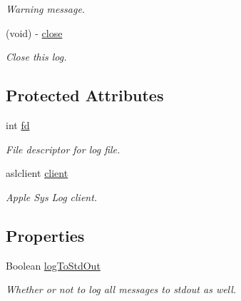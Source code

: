 \begin{DoxyCompactItemize}
\begin{DoxyCompactList}\small\item\em Warning message. \item\end{DoxyCompactList}\item 
(void) -\/ \hyperlink{interface_g_d_a_s_l_log_ae49db911364a0162197ad1044126c664}{close}
\begin{DoxyCompactList}\small\item\em Close this log. \item\end{DoxyCompactList}\end{DoxyCompactItemize}
\subsection*{Protected Attributes}
\begin{DoxyCompactItemize}
\item 
\hypertarget{interface_g_d_a_s_l_log_aa69c49b2936c65539d487acfbac9185d}{
int \hyperlink{interface_g_d_a_s_l_log_aa69c49b2936c65539d487acfbac9185d}{fd}}
\label{interface_g_d_a_s_l_log_aa69c49b2936c65539d487acfbac9185d}

\begin{DoxyCompactList}\small\item\em File descriptor for log file. \item\end{DoxyCompactList}\item 
\hypertarget{interface_g_d_a_s_l_log_ab29df9174c1a01a320b089b589fa731e}{
aslclient \hyperlink{interface_g_d_a_s_l_log_ab29df9174c1a01a320b089b589fa731e}{client}}
\label{interface_g_d_a_s_l_log_ab29df9174c1a01a320b089b589fa731e}

\begin{DoxyCompactList}\small\item\em Apple Sys Log client. \item\end{DoxyCompactList}\end{DoxyCompactItemize}
\subsection*{Properties}
\begin{DoxyCompactItemize}
\item 
\hypertarget{interface_g_d_a_s_l_log_af52ec0d7d7a656c095fc8af8d7035065}{
Boolean \hyperlink{interface_g_d_a_s_l_log_af52ec0d7d7a656c095fc8af8d7035065}{logToStdOut}}
\label{interface_g_d_a_s_l_log_af52ec0d7d7a656c095fc8af8d7035065}

\begin{DoxyCompactList}\small\item\em Whether or not to log all messages to stdout as well. \item\end{DoxyCompactList}\end{DoxyCompactItemize}


